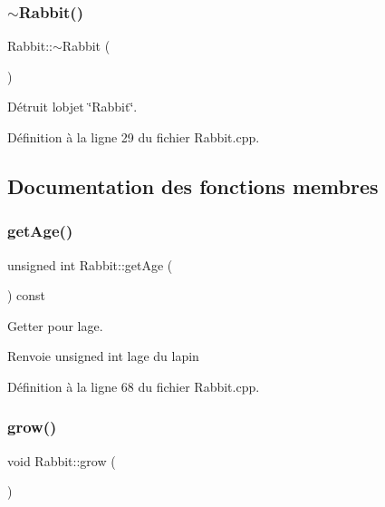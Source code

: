 \subsubsection{\texorpdfstring{$\sim$\+Rabbit()}{~Rabbit()}}
{\footnotesize\ttfamily Rabbit\+::$\sim$\+Rabbit (\begin{DoxyParamCaption}{ }\end{DoxyParamCaption})\hspace{0.3cm}{\ttfamily [virtual]}}



Détruit l\textquotesingle{}objet \char`\"{}\+Rabbit\char`\"{}. 



Définition à la ligne 29 du fichier Rabbit.\+cpp.



\subsection{Documentation des fonctions membres}
\mbox{\label{classRabbit_ab34450717cf7b3f9eb22747527c34922}} 
\subsubsection{\texorpdfstring{get\+Age()}{getAge()}}
{\footnotesize\ttfamily unsigned int Rabbit\+::get\+Age (\begin{DoxyParamCaption}{ }\end{DoxyParamCaption}) const}



Getter pour l\textquotesingle{}age. 

\begin{DoxyReturn}{Renvoie}
unsigned int l\textquotesingle{}age du lapin 
\end{DoxyReturn}


Définition à la ligne 68 du fichier Rabbit.\+cpp.

\mbox{\label{classRabbit_a404af8877c99ddc98108d88c8e466013}} 
\subsubsection{\texorpdfstring{grow()}{grow()}}
{\footnotesize\ttfamily void Rabbit\+::grow (\begin{DoxyParamCaption}{ }\end{DoxyParamCaption})\hspace{0.3cm}{\ttfamily [virtual]}}



